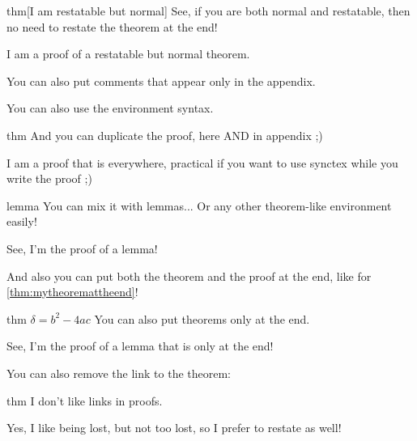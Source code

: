 \documentclass{article}
\begin{document}
\begin{theoremEnd}{thm}[I am restatable but normal]
  See, if you are both normal and restatable, then no need to restate the theorem at the end!
\end{theoremEnd}
\begin{proofEnd}
  I am a proof of a restatable but normal theorem.  
\end{proofEnd}

You can also put comments that appear only in the appendix.


\begin{textAtEnd}
  You can also use the environment syntax.
\end{textAtEnd}


\begin{theoremEnd}{thm}
  And you can duplicate the proof, here AND in appendix ;)  
\end{theoremEnd}
\begin{proofEnd}
  I am a proof that is everywhere, practical if you want to use synctex while you write the proof ;)
\end{proofEnd}

\begin{theoremEnd}{lemma}
  You can mix it with lemmas... Or any other theorem-like environment easily!  
\end{theoremEnd}
\begin{proofEnd}
  See, I'm the proof of a lemma!  
\end{proofEnd}

And also you can put both the theorem and the proof at the end, like for \autoref{thm:mytheoremattheend}!

\begin{theoremEnd}{thm}
  \label{thm:mytheoremattheend}
  $\delta = b^2-4ac$
  You can also put theorems only at the end.  
\end{theoremEnd}
\begin{proofEnd}
  See, I'm the proof of a lemma that is only at the end!
\end{proofEnd}


You can also remove the link to the theorem:
\begin{theoremEnd}{thm}
  I don't like links in proofs.  
\end{theoremEnd}
\begin{proofEnd}
  Yes, I like being lost, but not too lost, so I prefer to restate as well!
\end{proofEnd}
\end{document}

